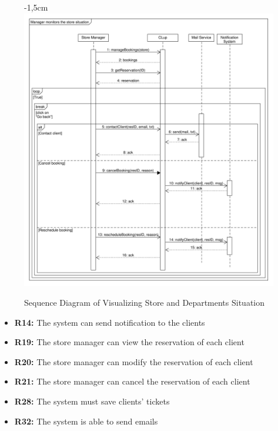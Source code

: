 \documentclass{article}
\begin{document}
\begin{center}
\begin{adjustwidth}{-2.8cm}{}
\begin{tabular}[h!]{|m{7.5em}|m{36em}|}
						\end{tabular}
					\end{adjustwidth}
				\newpage
					\begin{figure}[!h]
						\begin{adjustwidth} {-1,5cm}{}
							\centering
							\includegraphics[scale=0.42]{SD/9_manageReservations(store)}\\
							\caption{Sequence Diagram of Visualizing Store and Departments Situation}
						\end{adjustwidth}
					\end{figure}
					\begin{itemize}
						\medskip
						
						{\bfseries Required functional requirements: }
						
						\item {\bfseries R14: } The system can send notiﬁcation to the clients
						\item {\bfseries R19: }  The store manager can view the reservation of each client
						\item {\bfseries R20: } The store manager can modify the reservation of each client
						\item {\bfseries R21: } The store manager can cancel the reservation of each client
						\item {\bfseries R28: } The system must save clients’ tickets
						\item {\bfseries R32: } The system is able to send emails
						

					\end{itemize}	
					
				\end{center}
			
\end{document}

